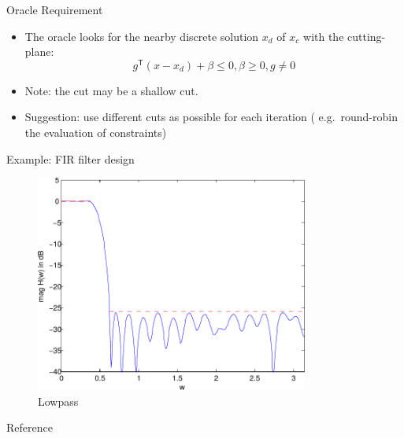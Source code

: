 \documentclass[
  ignorenonframetext,
  aspectratio=169,
  serif,onlymath]{beamer}
\newif\ifbibliography
\begin{document}
\begin{frame}{Oracle Requirement}
\protect\hypertarget{oracle-requirement}{}

\begin{itemize}
\item
  The oracle looks for the nearby discrete solution \(x_d\) of \(x_c\)
  with the cutting-plane:
  \[g^\mathsf{T} (x - x_d) + \beta \leq 0, \beta \geq 0, g \neq 0\]
\item
  Note: the cut may be a shallow cut.
\item
  Suggestion: use different cuts as possible for each iteration (
  e.g.~round-robin the evaluation of constraints)
\end{itemize}

\end{frame}

\begin{frame}{Example: FIR filter design}
\protect\hypertarget{example-fir-filter-design-1}{}

\begin{figure}
\centering
\includegraphics[width=0.8\textwidth,height=\textheight]{ellipsoid.files/lowpass_ripple.pdf}
\caption{Lowpass}
\end{figure}

\end{frame}

\renewcommand\refname{Reference}
\begin{frame}[allowframebreaks]{Reference}
  \bibliographytrue
  
\end{frame}
\end{document}
